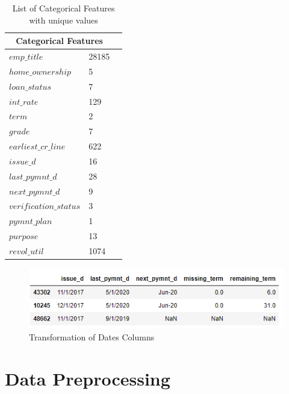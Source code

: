 \documentclass[12pt]{article}
\begin{document}
\begin{table}[h!]
	\centering
	\begin{tabular}{ |p{3cm}|p{3cm}|p{3cm}|  }
		\hline
		\multicolumn{2}{|c|}{Categorical Features} \\

		\hline
		$emp\_title$ & 28185 \\
		$home\_ownership$ & 5 \\
		$loan\_status$ & 7 \\
		$int\_rate$ & 129 \\
		$term$ & 2 \\
		$grade$ & 7 \\
		$earliest\_cr\_line$ & 622 \\
		$issue\_d$ & 16 \\
		$last\_pymnt\_d	$ & 28 \\
		$next\_pymnt\_d	$ & 9 \\
		$verification\_status$ & 3 \\
		$pymnt\_plan$ & 1 \\
		$purpose$ & 13 \\
		$revol\_util$ & 1074 \\
		\hline
	\end{tabular}
	\caption{List of Categorical Features with unique values}
	\label{table:1}
\end{table}


\begin{figure}[h!]
	\centering
	\includegraphics{dates.png}
	\caption{Transformation of Dates Columns}
	\label{fig:dates}
\end{figure}

\section{Data Preprocessing}
\end{document}
